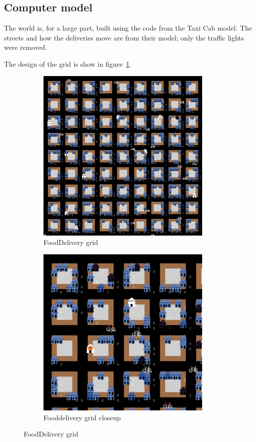 \subsection{Computer model}\label{subsec:computer-model}
The world is, for a large part, built using the code from the Taxi Cab model.
The streets and how the deliveries move are from their model; only the traffic lights were removed.

The design of the grid is show in figure~\ref{fig:grid}.
\begin{figure}
    \centering
    \begin{subfigure}[m]{0.4\textwidth}
        \centering
        \includegraphics[width=8.5cm]{sections/pics/grid}
        \caption{FoodDelivery grid}
    \end{subfigure}
    \hfill
    \begin{subfigure}[m]{0.4\textwidth}
        \centering
        \includegraphics[width=8.5cm]{sections/pics/grid_closeup}
        \caption{Fooddelivery grid closeup}
    \end{subfigure}
    \caption{FoodDelivery grid}
    \label{fig:grid}
\end{figure}

